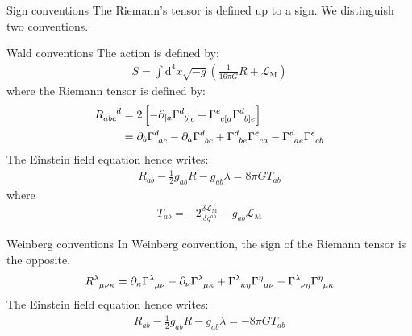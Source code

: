 \begin{section}{Sign conventions}
  The Riemann's tensor is defined up to a sign. We distinguish two conventions.
  \begin{subsection}{Wald conventions}
    The action is defined by:
    \begin{align}
      S=\int\mathrm d^4 x\sqrt{-g}\left(\frac{1}{16\pi G}R+\mathcal L_\mathrm M\right)
    \end{align}
    where the Riemann tensor is defined by:
    \begin{align}
      R_{abc}^{\hphantom{abc}d} &= 2\left[-\partial_{[a}\Gamma_{\hphantom{d}b]c}^d+\Gamma_{\hphantom{e}c[a}^e\Gamma^{d}_{\hphantom{d}b]e}\right]\\
      &= \partial_{b}\Gamma_{\hphantom{b}ac}^{d}-\partial_{a}\Gamma_{\hphantom{d}bc}^{d}+\Gamma_{\hphantom{d}be}^{d}\Gamma_{\hphantom{e}ca}^{e}-\Gamma_{\hphantom{d}ae}^{d}\Gamma_{\hphantom{e}cb}^{e}
    \end{align}    
    The Einstein field equation hence writes:
    \begin{align}
      R_{ab}-\frac{1}{2}g_{ab}R-g_{ab}\lambda = 8\pi GT_{ab}
    \end{align}
    where
    \begin{align}
      T_{ab} = -2\frac{\delta\mathcal L_\mathrm M}{\delta g^{ab}}-g_{ab}\mathcal L_\mathrm M
    \end{align}
  \end{subsection}

  \begin{subsection}{Weinberg conventions}
    In Weinberg convention, the sign of the Riemann tensor is the opposite.
    \begin{align}
      R^{\lambda}_{\hphantom{\lambda}\mu\nu\kappa} =
      \partial_{\kappa}\Gamma_{\hphantom{\lambda}\mu\nu}^{\lambda}-\partial_{\nu}\Gamma_{\hphantom{\lambda}\mu\kappa}^{\lambda}+\Gamma_{\hphantom{\lambda}\kappa\eta}^{\lambda}\Gamma_{\hphantom{\eta}\mu\nu}^{\eta}-\Gamma_{\hphantom{\lambda}\nu\eta}^{\lambda}\Gamma_{\hphantom{\eta}\mu\kappa}^{\eta}
    \end{align}
    The Einstein field equation hence writes:
    \begin{align}
      R_{ab}-\frac{1}{2}g_{ab}R-g_{ab}\lambda = -8\pi GT_{ab}
    \end{align}
  \end{subsection}
  

\end{section}
